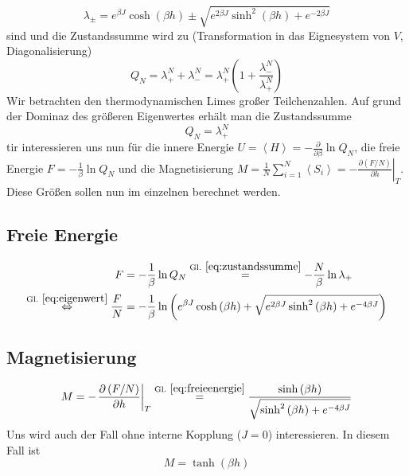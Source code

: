 		\begin{equation}
				\lambda_{\pm}=e^{\beta J}\cosh\left(\beta h\right)\pm\sqrt{e^{2\beta J}\sinh^2\left(\beta h\right)+e^{-2\beta J}}\label{eq:eigenwert}
		\end{equation}
		sind und die Zustandssumme wird zu (Transformation in das Eignesystem von $V$, Diagonalisierung)
		\begin{equation*}
				Q_N=\lambda_+^N+\lambda_-^N=\lambda_+^N\left(1+\frac{\lambda_-^N}{\lambda_+^N}\right)
		\end{equation*}
		Wir betrachten den thermodynamischen Limes großer Teilchenzahlen. Auf grund der Dominaz des größeren Eigenwertes erhält man die Zustandssumme
		\begin{equation}
				Q_N=\lambda_+^N\label{eq:zustandssumme}
		\end{equation}
		tir interessieren uns nun für die innere Energie $U=\left<H\right>=-\frac{\partial}{\partial\beta}\ln Q_N$, die freie Energie $F=-\frac{1}{\beta}\ln Q_N$ und die Magnetisierung $M=\frac{1}{N}\sum\limits_{i=1}^N\left<S_i\right>=-{\left.\frac{\partial\left(F/N\right)}{\partial h}\right|}_T$. Diese Größen sollen nun im einzelnen berechnet werden.

		\subsection{Freie Energie}
		\begin{align}
    F&=-\frac{1}{\beta}\ln Q_N\overset{\mathrm{Gl.~\eqref{eq:zustandssumme}}}{=}-\frac{N}{\beta}\ln\lambda_+ \nonumber\\
				\overset{\mathrm{Gl.~\eqref{eq:eigenwert}}}{\Leftrightarrow}\frac{F}{N}&=-\frac{1}{\beta}\ln\left(e^{\beta J}\cosh\left(\beta h\right)+\sqrt{e^{2\beta J}\sinh^2\left(\beta h\right)+e^{-4\beta J}}\right)\label{eq:freieenergie}
		\end{align}

		\subsection{Magnetisierung}
		\begin{equation}
				M=-{\left.\frac{\partial\left(F/N\right)}{\partial h}\right|}_T\overset{\mathrm{Gl.~\eqref{eq:freieenergie}}}{=}\frac{\sinh\left(\beta h\right)}{\sqrt{\sinh^2\left(\beta h\right)+e^{-4\beta J}}}\label{eq:magnetisierung}
		\end{equation}
		Uns wird auch der Fall ohne interne Kopplung ($J=0$) interessieren. In diesem Fall ist
		\begin{equation}
				M=\tanh\left(\beta h\right)\label{eq:magnetisierungJ0}
		\end{equation}

